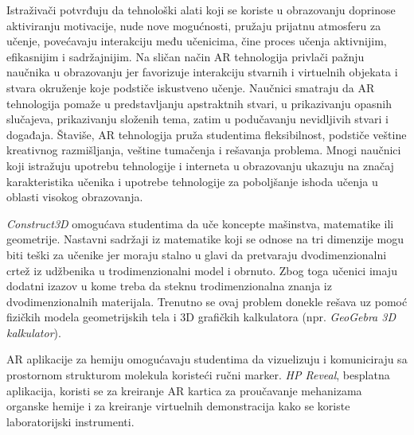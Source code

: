 \documentclass[a4paper]{article}
\begin{document}
	Istraživači potvrđuju da tehnološki alati koji se koriste u obrazovanju doprinose aktiviranju motivacije, nude nove mogućnosti, pružaju prijatnu atmosferu za učenje, 
	povećavaju interakciju među učenicima, čine proces učenja aktivnijim, efikasnijim i sadržajnijim. Na sličan način AR tehnologija privlači pažnju naučnika u obrazovanju 
	jer favorizuje interakciju stvarnih i virtuelnih objekata i stvara okruženje koje podstiče iskustveno učenje. Naučnici smatraju da AR tehnologija pomaže u predstavljanju 
	apstraktnih stvari, u prikazivanju opasnih slučajeva, prikazivanju složenih tema, zatim u podučavanju nevidljivih stvari i događaja. Štaviše, AR tehnologija pruža studentima 
	fleksibilnost, podstiče veštine kreativnog razmišljanja, veštine tumačenja i rešavanja problema. Mnogi naučnici koji istražuju upotrebu tehnologije i interneta u obrazovanju 
	ukazuju na značaj karakteristika učenika i upotrebe tehnologije za poboljšanje ishoda učenja u oblasti visokog obrazovanja.

	\emph{Construct3D} omogućava studentima da uče koncepte mašinstva, matematike ili geometrije. Nastavni sadržaji iz matematike koji se odnose na tri dimenzije mogu biti teški za učenike 
	jer moraju stalno u glavi da pretvaraju dvodimenzionalni crtež iz udžbenika u trodimenzionalni model i obrnuto. Zbog toga učenici imaju dodatni izazov u kome treba da steknu 
	trodimenzionalna znanja iz dvodimenzionalnih materijala. Trenutno se ovaj problem donekle rešava uz pomoć fizičkih modela geometrijskih tela i 3D grafičkih kalkulatora (npr. \emph{GeoGebra 3D kalkulator}).
	
	AR aplikacije za hemiju omogućavaju studentima da vizuelizuju i komuniciraju sa prostornom strukturom molekula koristeći ručni marker. \emph{HP Reveal}, besplatna aplikacija, koristi 
	se za kreiranje AR kartica za proučavanje mehanizama organske hemije i za kreiranje virtuelnih demonstracija kako se koriste laboratorijski instrumenti.
\end{document}
